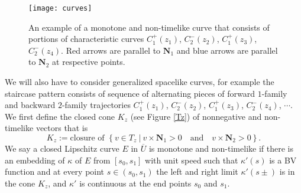 \documentclass[11pt]{amsart}
\theoremstyle{plain}
\theoremstyle{remark}
\numberwithin{equation}{section}
\numberwithin{Thm}{section}
\def\U{\overline{U}}
\def\N{{\mathbf N}}
\begin{document}
 \begin{figure}[ht]
 \centering
 \texttt{[image: curves]} 
 \caption{An example of a monotone and non-timelike curve that consists of portions of characteristic curves $C^+_1(z_1)$, $C^-_2(z_2)$, $C^+_1(z_3)$, $C^-_2(z_4)$. Red arrows are parallel to $\N_1$ and blue arrows are parallel to $\N_2$ at respective points.} \label{fig3}
\end{figure} 
 
We will also have to consider generalized spacelike curves, for example the staircase pattern consists of sequence of  alternating pieces of forward $1$-family and backward $2$-family trajectories $C^+_1(z_1)$, $C^-_2(z_2)$, $C^+_1(z_3)$, $C^-_2(z_4)$, $\cdots$. We first define the closed cone $K_z$ (see Figure \ref{Tz})  of nonnegative and non-timelike  vectors that is 
 \begin{equation} \label{Kz}
  K_z:= \text{closure of } \left\{ v \in T_z ~|~ v \times \N_1>0 \quad \text{and} \quad v \times \N_2>0\right\}.
 \end{equation}
  We say a closed Lipschitz curve $E$ in $\U$ is monotone and non-timelike if there is an embedding of $\kappa$ of $E$ from $[s_0, s_1]$ with unit speed such that $\kappa'(s)$ is a BV function and at every point $s\in(s_0,s_1)$ the left and right limit $\kappa'(s\pm)$ is in the cone $K_z$, and $\kappa'$ is continuous at the end points $s_0$ and $s_1$. %
\end{document}
